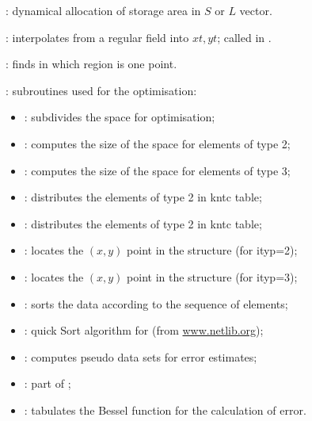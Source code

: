 \begin{description}
\item[]: dynamical allocation of storage area in $S$ or $L$ vector.
\item[]: interpolates from a regular field into $xt,yt$; called in .
\item[]: finds in which region is one point.
\item[]: subroutines used for the optimisation:

\begin{itemize}

\item[] : subdivides the space for optimisation;
\item[] : computes the size of the space for elements of type 2;
\item[] : computes the size of the space for elements of type 3;
\item[] : distributes the elements of type 2 in kntc table;
\item[] : distributes the elements of type 2 in kntc table;
\item[] :  locates the $(x,y)$ point in the structure (for ityp=2);
\item[] :  locates the $(x,y)$ point in the structure (for ityp=3);
\item[] :  sorts the data according to the sequence of elements;
\item[] :  quick Sort algorithm for  (from \url{www.netlib.org});
\item[] : computes pseudo data sets for error estimates;
\item[] :  part of ;
\item[] : tabulates the Bessel function for the calculation of error.
\end{itemize}



\end{description}
